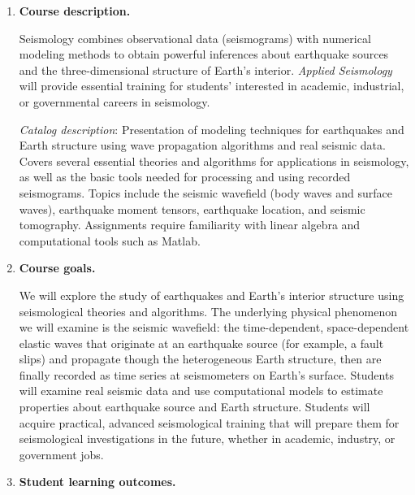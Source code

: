 \documentclass[10pt,titlepage,fleqn]{article}
\begin{document}
\begin{enumerate}
\begin{enumerate}
\end{enumerate}

\item {\bf Course description.}

Seismology combines observational data (seismograms) with numerical modeling methods to obtain powerful inferences about earthquake sources and the three-dimensional structure of Earth's interior. {\em Applied Seismology} will provide essential training for students' interested in academic, industrial, or governmental careers in seismology.

{\em Catalog description}: Presentation of modeling techniques for earthquakes and Earth structure using wave propagation algorithms and real seismic data. Covers several essential theories and algorithms for applications in seismology, as well as the basic tools needed for processing and using recorded seismograms. Topics include the seismic wavefield (body waves and surface waves), earthquake moment tensors, earthquake location, and seismic tomography. Assignments require familiarity with linear algebra and computational tools such as Matlab.

\item {\bf Course goals.}

We will explore the study of earthquakes and Earth's interior structure using seismological theories and algorithms. The underlying physical phenomenon we will examine is the seismic wavefield: the time-dependent, space-dependent elastic waves that originate at an earthquake source (for example, a fault slips) and propagate though the heterogeneous Earth structure, then are finally recorded as time series at seismometers on Earth's surface. Students will examine real seismic data and use computational models to estimate properties about earthquake source and Earth structure. Students will acquire practical, advanced seismological training that will prepare them for seismological investigations in the future, whether in academic, industry, or government jobs.

\item {\bf Student learning outcomes.}


\end{enumerate}
\end{document}
